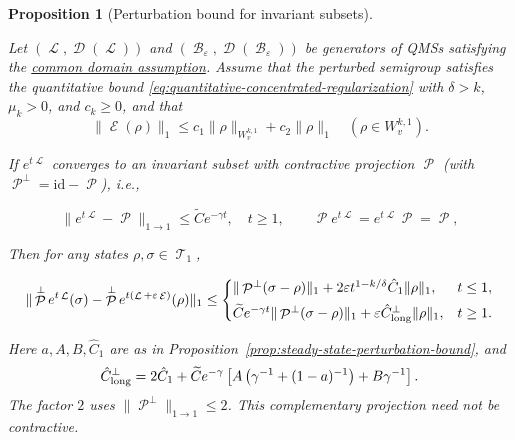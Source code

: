 \documentclass[11pt]{article}
\theoremstyle{myplain}
\newtheorem{prop}[prop]{Proposition}
\theoremstyle{mydefinition}
\theoremstyle{remark}
\DeclareMathOperator{\cB}{\mathcal{B}}
\DeclareMathOperator{\cD}{\mathcal{D}}
\DeclareMathOperator{\cE}{\mathcal{E}}
\DeclareMathOperator{\cL}{\mathcal{L}}
\DeclareMathOperator{\cP}{\mathcal{P}}
\DeclareMathOperator{\cT}{\mathcal{T}}
\DeclareMathOperator{\1}{\mathds{1}}
\begin{document}
        \begin{prop}[Perturbation bound for invariant subsets]\label{prop:invariant-subset-perturbation-bound}
            
            Let $(\cL,\cD(\cL))$ and $(\cB_\varepsilon,\cD(\cB_\varepsilon))$ be generators of QMSs satisfying the \hyperref[assum:perturbation-common-domain]{common domain assumption}. Assume that the perturbed semigroup satisfies the quantitative bound \eqref{eq:quantitative-concentrated-regularization} with $\delta>k$, $\mu_k>0$, and $c_k\geq0$, and that
            \begin{equation}\label{eq:invariant-relative-sobolev-bound}
                \|\cE(\rho)\|_1\leq c_1\|\rho\|_{W_v^{k,1}}+c_2\|\rho\|_1
                \quad(\rho\in W_v^{k,1}).
            \end{equation}
            
            If $e^{t\cL}$ converges to an invariant subset with contractive projection $\cP$ (with $\cP^\perp=\mathrm{id}-\cP$), i.e.,
            
            \begin{equation*}
                \|e^{t\cL}-\cP\|_{1\to1}\leq\widetilde C e^{-\gamma t},\quad t\geq1,
                \qquad \cP e^{t\cL}=e^{t\cL}\cP=\cP,
            \end{equation*}
            
            Then for any states $\rho,\sigma\in\cT_1$,
            
            \begin{equation*}
                \begin{aligned}
                    \|\cP^\perp e^{t\cL}(\sigma)-\cP^\perp e^{t(\cL+\varepsilon\cE)}(\rho)\|_1
                    \leq
                    \begin{cases}
                        \|\cP^\perp(\sigma-\rho)\|_1+2\varepsilon t^{1-k/\delta}\hat C_1\|\rho\|_1,&t\leq1,\\[4pt]
                        \widetilde C e^{-\gamma t}\|\cP^\perp(\sigma-\rho)\|_1+
                        \varepsilon\hat C_{\rm long}^\perp\|\rho\|_1,&t\geq1.
                    \end{cases}
                \end{aligned}
            \end{equation*}
            
            
            Here $a,A,B,\hat C_1$ are as in Proposition~\ref{prop:steady-state-perturbation-bound}, and
            \begin{equation*}
                \hat C_{\rm long}^{\perp}=2\hat C_1+\widetilde C e^{-\gamma}
                \left[A\left(\gamma^{-1}+(1-a)^{-1}\right)+B\gamma^{-1}\right].
            \end{equation*}
            The factor $2$ uses $\|\cP^\perp\|_{1\to1}\leq2$. This complementary projection need not be contractive.
            
        \end{prop}
\end{document}
